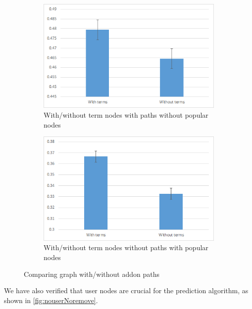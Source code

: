 \documentclass[11pt,oneside]{book}
\begin{document}
\begin{figure}[p]
\centering
\begin{subfigure}[b]{0.49\textwidth}
	\centering
\includegraphics[scale=0.49]{figures/5addonswithoutTermsComp.png}
\caption{With/without term nodes with paths without popular nodes}
\label{fig:with_without_terms5}
\end{subfigure}
\begin{subfigure}[b]{0.49\textwidth}
	\centering
\includegraphics[scale=0.49]{figures/2addonswithoutTermsComp.png}
\caption{With/without term nodes without paths with popular nodes}
\label{fig:with_without_terms2}
\end{subfigure}
\caption{Comparing graph with/without addon paths}
	\label{fig:with_without_terms}
\end{figure}

We have also verified that user nodes are crucial for the prediction algorithm, as shown in \autoref{fig:nouserNoremove}.
\end{document}
